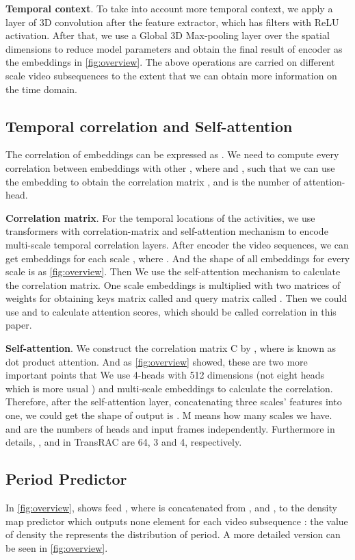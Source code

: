 \documentclass[10pt,twocolumn,letterpaper]{article}
\begin{document}
\noindent \textbf{Temporal context}.
To take into account more temporal context, we apply a layer of 3D convolution after the feature extractor, which has  filters with ReLU activation. After that, we use a Global 3D Max-pooling layer over the spatial dimensions to reduce model parameters and obtain the final result  of encoder  as the embeddings in \cref{fig:overview}. The above operations are carried on different scale video subsequences to the extent that we can obtain more information on the time domain.

\subsection{Temporal correlation and Self-attention}
The correlation of embeddings can be expressed as . We need to compute every correlation  between  embeddings with other , where  and , such that we can use the embedding  to obtain the correlation matrix ,  and  is the number of attention-head.

\noindent \textbf{Correlation matrix}.
For the temporal locations of the activities, we use transformers\cite{vaswani2017attention} with correlation-matrix and self-attention mechanism to encode multi-scale temporal correlation layers. After encoder the video sequences, we can get embeddings  for each scale , where . And the shape of all embeddings for every scale is  as \cref{fig:overview}. Then We use the self-attention mechanism to calculate the correlation matrix. One scale embeddings  is multiplied with two matrices of weights for obtaining keys matrix called  and query matrix called . Then we could use  and  to calculate attention scores, which should be called correlation in this paper.

\noindent \textbf{Self-attention}.
We construct the correlation matrix C by , where  is known as dot product attention. And as \cref{fig:overview} showed, these are two more important points that We use 4-heads with 512 dimensions (not eight heads which is more usual \cite{vaswani2017attention}) and multi-scale embeddings to calculate the correlation. Therefore, after the self-attention layer, concatenating three scales' features into one, we could get the shape of output is . M means how many scales we have.  and  are the numbers of heads and input frames independently. Furthermore in details, ,  and  in TransRAC are 64, 3 and 4, respectively.

\subsection{Period Predictor}
In \cref{fig:overview},  shows feed , where  is concatenated from ,  and , to the density map predictor which outputs none element for each video subsequence : the value of density  the  represents the distribution of period. A more detailed version can be seen in \cref{fig:overview}.
\end{document}
